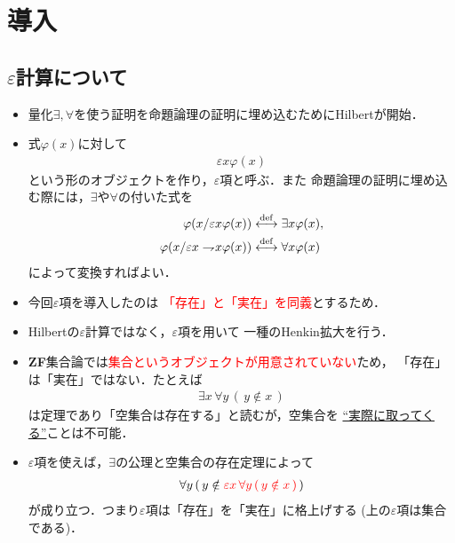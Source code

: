 \section{導入}
\subsection{$\varepsilon$計算について}
	\begin{itemize}
	\setlength{\itemsep}{10pt}
		\item 量化$\exists,\forall$を使う証明を命題論理の証明に埋め込むためにHilbertが開始．
		
		\item 式$\varphi(x)$に対して
			\begin{align}
				\varepsilon x \varphi(x)
			\end{align}
			という形のオブジェクトを作り，$\varepsilon$項と呼ぶ．また
			命題論理の証明に埋め込む際には，$\exists$や$\forall$の付いた式を
			\begin{align}
				\varphi(x/\varepsilon x \varphi(x)) &\overset{\mathrm{def}}{\longleftrightarrow} \exists x \varphi(x), \\
				\varphi(x/\varepsilon x \rightharpoondown\hspace{-0.25em} x \varphi(x)) &\overset{\mathrm{def}}{\longleftrightarrow} \forall x \varphi(x)
			\end{align}
			によって変換すればよい．
			
		\item 今回$\varepsilon$項を導入したのは
			\textcolor{red}{「存在」と「実在」を同義}とするため．
			
		\item Hilbertの$\varepsilon$計算ではなく，$\varepsilon$項を用いて
			一種のHenkin拡大を行う．
	\end{itemize}
	
\newpage
	\begin{itemize}
	\setlength{\itemsep}{10pt}
		\item {\bf ZF}集合論では\textcolor{red}{集合というオブジェクトが用意されていない}ため，
			「存在」は「実在」ではない．たとえば
			\begin{align}
				\exists x\, \forall y\, (\, y \notin x\, )
			\end{align}
			は定理であり「空集合は存在する」と読むが，空集合を
			\underline{``実際に取ってくる''}ことは不可能．
			
		\item $\varepsilon$項を使えば，$\exists$の公理と空集合の存在定理によって
			\begin{align}
				\forall y\, (\, y \notin \color{red}{\varepsilon x\, \forall y\, (\, y \notin x\, )}\, \color{black}{)}
			\end{align}
			が成り立つ．つまり$\varepsilon$項は「存在」を「実在」に格上げする
			(上の$\varepsilon$項は集合である)．
	\end{itemize}
	
